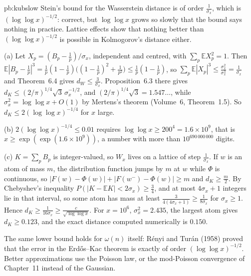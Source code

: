 \begin{solution}{pb:kubslow}
\idea Stein's bound for the Wasserstein distance is of order $\frac1{\sigma_x}$, which is $(\log\log x)^{-1/2}$: correct, but $\log\log x$ grows so slowly that the
bound says nothing in practice. Lattice effects show that nothing better than $(\log\log x)^{-1/2}$ is possible in Kolmogorov's distance either.

\writeup (a) Let $X_p=(B_p-\frac1p)/\sigma_x$, independent and centred, with $\sum_p\mathbb EX_p^2=1$. Then
$\mathbb E|B_p-\frac1p|^3=\frac1p(1-\frac1p)\bigl((1-\frac1p)^2+\frac1{p^2}\bigr)\le\frac1p(1-\frac1p)$, so $\sum_p\mathbb E|X_p|^3\le\frac{\sigma_x^2}{\sigma_x^3}=\frac1{\sigma_x}$ and
Theorem~6.4 gives $d_W\le\frac3{\sigma_x}$. Proposition~6.3 there gives $d_K\le(2/\pi)^{1/4}\sqrt3\,\sigma_x^{-1/2}$, and $(2/\pi)^{1/4}\sqrt3=1.547\ldots$, while
$\sigma_x^2=\log\log x+O(1)$ by Mertens's theorem (Volume~6, Theorem~1.5). So $d_K\le2(\log\log x)^{-1/4}$ for $x$ large.

(b) $2(\log\log x)^{-1/4}\le0.01$ requires $\log\log x\ge200^4=1.6\times10^9$, that is $x\ge\exp(\exp(1.6\times10^9))$, a number with more than $10^{690\,000\,000}$ digits.

(c) $K=\sum_pB_p$ is integer-valued, so $W_x$ lives on a lattice of step $\frac1{\sigma_x}$. If $w$ is an atom of mass $m$, the distribution function jumps by $m$ at $w$
while $\Phi$ is continuous, so $|F(w)-\Phi(w)|+|F(w^-)-\Phi(w)|\ge m$ and $d_K\ge\frac m2$. By Chebyshev's inequality $P(|K-\mathbb EK|<2\sigma_x)\ge\frac34$, and at most
$4\sigma_x+1$ integers lie in that interval, so some atom has mass at least $\frac3{4(4\sigma_x+1)}\ge\frac1{8\sigma_x}$ for $\sigma_x\ge1$. Hence $d_K\ge\frac1{16\sigma_x}\ge\frac c{\sqrt{\log\log x}}$.
For $x=10^6$, $\sigma_x^2=2.435$, the largest atom gives $d_K\ge0.123$, and the exact distance computed numerically is $0.150$.

\leads The same lower bound holds for $\omega(n)$ itself: Rényi and Turán (1958) proved that the error in the Erdős--Kac theorem is exactly of order
$(\log\log x)^{-1/2}$. Better approximations use the Poisson law, or the mod-Poisson convergence of Chapter~11 instead of the Gaussian.
\end{solution}


